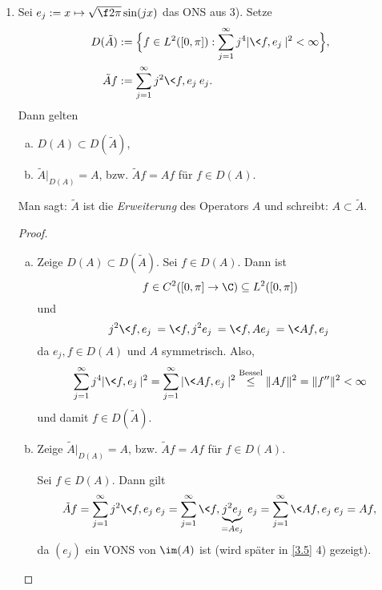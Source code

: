 \begin{ex}
\begin{enumerate}[1)]
\begin{proof}
				Da $A$ symmetrisch (also die Eigenfunktionen $e_j$ orthogonal) und
				\[
					\|e_j\|^2 = \int_0^\pi \f 2\pi \sin^2(x) \dx = \f 1\pi \int_0^\pi 1 - \cos(2x) \dx = 1,
				\]
				bilden die $(e_j)$ ein ONS.
			\end{proof}
		\item
			Sei $e_j := x \mapsto \sqrt{\f 2\pi} \sin(jx)$ das ONS aus 3).
			Setze
			\begin{align*}
				D(\tilde A) &:= \Big\{ f\in L^2([0,\pi]) : \sum_{j=1}^\infty j^4 |\<f,e_j\>|^2 < \infty \Big\}, \\
				\tilde A f &:= \sum_{j=1}^\infty j^2 \<f, e_j \> e_j.
			\end{align*}
			Dann gelten
			\begin{enumerate}[a)]
				\item
					$D(A) \subset D(\tilde A)$,
				\item
					$\tilde A \Big|_{D(A)} = A$, bzw. $\tilde Af = Af$ für $f \in D(A)$.
			\end{enumerate}
			Man sagt: $\tilde A$ ist die \emph{Erweiterung} des Operators $A$ und schreibt: $A \subset \tilde A$.
			\begin{proof}
				\begin{enumerate}[a)]
					\item
						Zeige $D(A) \subset D(\tilde A)$.
						Sei $f \in D(A)$. Dann ist
						\[
							f \in C^2([0,\pi]\to \C) \subset L^2([0,\pi])
						\]
						und
						\[
							j^2\<f,e_j\> = \<f,j^2e_j\> = \<f,Ae_j\>= \<Af, e_j\>
						\]
						da $e_j, f \in D(A)$ und $A$ symmetrisch.
						Also,
						\[
							\sum_{j=1}^\infty j^4|\<f,e_j\>|^2
							= \sum_{j=1}^\infty |\<Af,e_j\>|^2
							\stackrel{\text{Bessel}}\le \|Af\|^2
							= \|f''\|^2
							< \infty
						\]
						und damit $f \in D(\tilde A)$.
					\item
						Zeige $\tilde A \Big|_{D(A)} = A$, bzw. $\tilde Af = Af$ für $f \in D(A)$.

						Sei $f \in D(A)$. Dann gilt
						\begin{align*}
							\tilde Af = \sum_{j=1}^\infty j^2 \<f,e_j\> e_j = \sum_{j=1}^\infty \<f,\underbrace{j^2e_j}_{=Ae_j}\> e_j = \sum_{j=1}^\infty \<Af, e_j\> e_j= Af,
						\end{align*}
						da $(e_j)$ ein VONS von $\im(A)$ ist (wird später in \ref{3.5} 4) gezeigt).
				\end{enumerate}
			\end{proof}
	\end{enumerate}
\end{ex}

